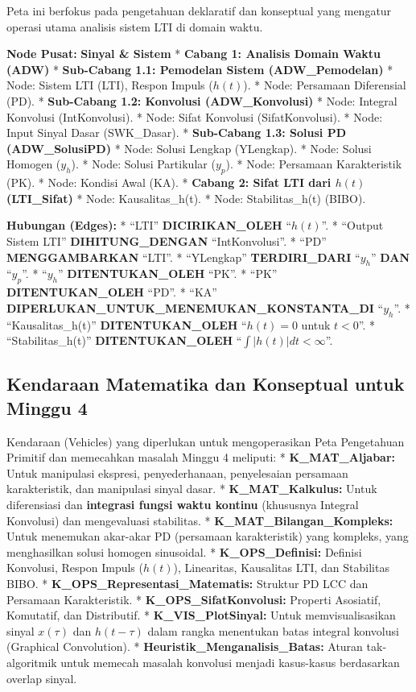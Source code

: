 \documentclass[
  letterpaper,
  DIV=11,
  numbers=noendperiod]{scrreprt}
\begin{document}
Peta ini berfokus pada pengetahuan deklaratif dan konseptual yang
mengatur operasi utama analisis sistem LTI di domain waktu.

\textbf{Node Pusat:} \textbf{Sinyal \& Sistem} * \textbf{Cabang 1:
Analisis Domain Waktu (ADW)} * \textbf{Sub-Cabang 1.1: Pemodelan Sistem
(ADW\_Pemodelan)} * Node: Sistem LTI (LTI), Respon Impuls (\(h(t)\)). *
Node: Persamaan Diferensial (PD). * \textbf{Sub-Cabang 1.2: Konvolusi
(ADW\_Konvolusi)} * Node: Integral Konvolusi (IntKonvolusi). * Node:
Sifat Konvolusi (SifatKonvolusi). * Node: Input Sinyal Dasar
(SWK\_Dasar). * \textbf{Sub-Cabang 1.3: Solusi PD (ADW\_SolusiPD)} *
Node: Solusi Lengkap (YLengkap). * Node: Solusi Homogen (\(y_h\)). *
Node: Solusi Partikular (\(y_p\)). * Node: Persamaan Karakteristik (PK).
* Node: Kondisi Awal (KA). * \textbf{Cabang 2: Sifat LTI dari \(h(t)\)
(LTI\_Sifat)} * Node: Kausalitas\_h(t). * Node: Stabilitas\_h(t) (BIBO).

\textbf{Hubungan (Edges):} * ``LTI'' \textbf{DICIRIKAN\_OLEH}
``\(h(t)\)''. * ``Output Sistem LTI'' \textbf{DIHITUNG\_DENGAN}
``IntKonvolusi''. * ``PD'' \textbf{MENGGAMBARKAN} ``LTI''. *
``YLengkap'' \textbf{TERDIRI\_DARI} ``\(y_h\)'' \textbf{DAN}
``\(y_p\)''. * ``\(y_h\)'' \textbf{DITENTUKAN\_OLEH} ``PK''. * ``PK''
\textbf{DITENTUKAN\_OLEH} ``PD''. * ``KA''
\textbf{DIPERLUKAN\_UNTUK\_MENEMUKAN\_KONSTANTA\_DI} ``\(y_h\)''. *
``Kausalitas\_h(t)'' \textbf{DITENTUKAN\_OLEH} ``\(h(t)=0\) untuk
\(t<0\)''. * ``Stabilitas\_h(t)'' \textbf{DITENTUKAN\_OLEH}
``\(\int |h(t)| dt < \infty\)''.

\subsection{Kendaraan Matematika dan Konseptual untuk Minggu
4}\label{kendaraan-matematika-dan-konseptual-untuk-minggu-4}

Kendaraan (Vehicles) yang diperlukan untuk mengoperasikan Peta
Pengetahuan Primitif dan memecahkan masalah Minggu 4 meliputi: *
\textbf{K\_MAT\_Aljabar:} Untuk manipulasi ekspresi, penyederhanaan,
penyelesaian persamaan karakteristik, dan manipulasi sinyal dasar. *
\textbf{K\_MAT\_Kalkulus:} Untuk diferensiasi dan \textbf{integrasi
fungsi waktu kontinu} (khususnya Integral Konvolusi) dan mengevaluasi
stabilitas. * \textbf{K\_MAT\_Bilangan\_Kompleks:} Untuk menemukan
akar-akar PD (persamaan karakteristik) yang kompleks, yang menghasilkan
solusi homogen sinusoidal. * \textbf{K\_OPS\_Definisi:} Definisi
Konvolusi, Respon Impuls (\(h(t)\)), Linearitas, Kausalitas LTI, dan
Stabilitas BIBO. * \textbf{K\_OPS\_Representasi\_Matematis:} Struktur PD
LCC dan Persamaan Karakteristik. * \textbf{K\_OPS\_SifatKonvolusi:}
Properti Asosiatif, Komutatif, dan Distributif. *
\textbf{K\_VIS\_PlotSinyal:} Untuk memvisualisasikan sinyal \(x(\tau)\)
dan \(h(t-\tau)\) dalam rangka menentukan batas integral konvolusi
(Graphical Convolution). * \textbf{Heuristik\_Menganalisis\_Batas:}
Aturan tak-algoritmik untuk memecah masalah konvolusi menjadi
kasus-kasus berdasarkan overlap sinyal.
\end{document}
